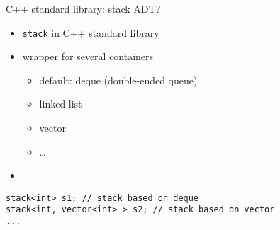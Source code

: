 \begin{frame}[fragile,label=stackAdt]{C++ standard library: stack ADT?}
\lstset{
    language=C++,
    style=small
}
\begin{itemize}
\item \texttt{stack} in C++ standard library
\item wrapper for several containers
    \begin{itemize}
    \item default: deque (double-ended queue)
    \item linked list
    \item vector
    \item \ldots
    \end{itemize}
\item {}
\end{itemize}
\begin{lstlisting}
stack<int> s1; // stack based on deque
stack<int, vector<int> > s2; // stack based on vector
...
\end{lstlisting}
\end{frame}
